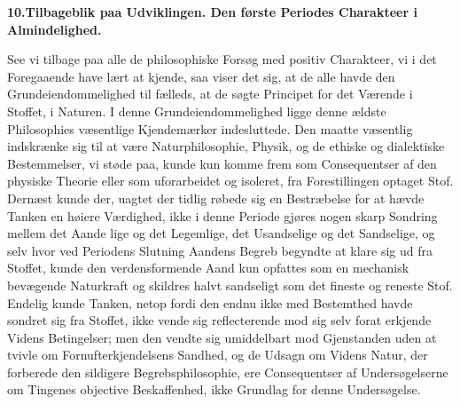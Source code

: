 \documentclass[12pt,a4paper]{book}
\begin{document}
\begin{center}
\textbf{10.\enspace Tilbageblik paa Udviklingen. Den første Periodes Charakteer i Almindelighed.}
\end{center}
See vi tilbage paa alle de philosophiske Forsøg med positiv
Charakteer, vi i det Foregaaende have lært at kjende, saa
viser det sig, at de alle havde den Grundeiendommelighed til\-%
fælleds, at de søgte Principet for det Værende i Stoffet, i
Naturen. I denne Grundeiendommelighed ligge denne ældste
Philosophies væsentlige Kjendemærker indesluttede. Den maatte
væsentlig indskrænke sig til at være Naturphilosophie, Physik,
og de ethiske og dialektiske Bestemmelser, vi støde paa, kunde
kun komme frem som Consequentser af den physiske Theorie
eller som uforarbeidet og isoleret, fra Forestillingen optaget
Stof. Dernæst kunde der, uagtet der tidlig røbede sig en
Bestræbelse for at hævde Tanken en høiere Værdighed, ikke i
denne Periode gjøres nogen skarp Sondring mellem det Aande\-%
lige og det Legemlige, det Usandselige og det Sandselige, og
selv hvor ved Periodens Slutning Aandens Begreb begyndte at
klare sig ud fra Stoffet, kunde den verdensformende Aand kun
opfattes som en mechanisk bevægende Naturkraft og skildres
halvt sandseligt som det fineste og reneste Stof. Endelig
kunde Tanken, netop fordi den endnu ikke med Bestemthed
havde sondret sig fra Stoffet, ikke vende sig reflecterende
mod sig selv forat erkjende Videns Betingelser; men den
vendte sig umiddelbart mod Gjenstanden uden at tvivle om
Fornufterkjendelsens Sandhed, og de Udsagn om Videns Natur,
der forberede den sildigere Begrebsphilosophie, ere Consequentser
af Undersøgelserne om Tingenes objective Beskaffenhed, ikke
Grundlag for denne Undersøgelse.
\end{document}
